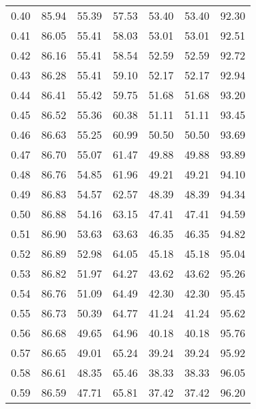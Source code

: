 \begin{tabular}{|c|c|c|c|c|c|c|}
      0.40 &     85.94 &     55.39 &      57.53 &   53.40 &      53.40 &         92.30 \\
      0.41 &     86.05 &     55.41 &      58.03 &   53.01 &      53.01 &         92.51 \\
      0.42 &     86.16 &     55.41 &      58.54 &   52.59 &      52.59 &         92.72 \\
      0.43 &     86.28 &     55.41 &      59.10 &   52.17 &      52.17 &         92.94 \\
      0.44 &     86.41 &     55.42 &      59.75 &   51.68 &      51.68 &         93.20 \\
      0.45 &     86.52 &     55.36 &      60.38 &   51.11 &      51.11 &         93.45 \\
      0.46 &     86.63 &     55.25 &      60.99 &   50.50 &      50.50 &         93.69 \\
      0.47 &     86.70 &     55.07 &      61.47 &   49.88 &      49.88 &         93.89 \\
      0.48 &     86.76 &     54.85 &      61.96 &   49.21 &      49.21 &         94.10 \\
      0.49 &     86.83 &     54.57 &      62.57 &   48.39 &      48.39 &         94.34 \\
      0.50 &     86.88 &     54.16 &      63.15 &   47.41 &      47.41 &         94.59 \\
      0.51 &     86.90 &     53.63 &      63.63 &   46.35 &      46.35 &         94.82 \\
      0.52 &     86.89 &     52.98 &      64.05 &   45.18 &      45.18 &         95.04 \\
      0.53 &     86.82 &     51.97 &      64.27 &   43.62 &      43.62 &         95.26 \\
      0.54 &     86.76 &     51.09 &      64.49 &   42.30 &      42.30 &         95.45 \\
      0.55 &     86.73 &     50.39 &      64.77 &   41.24 &      41.24 &         95.62 \\
      0.56 &     86.68 &     49.65 &      64.96 &   40.18 &      40.18 &         95.76 \\
      0.57 &     86.65 &     49.01 &      65.24 &   39.24 &      39.24 &         95.92 \\
      0.58 &     86.61 &     48.35 &      65.46 &   38.33 &      38.33 &         96.05 \\
      0.59 &     86.59 &     47.71 &      65.81 &   37.42 &      37.42 &         96.20 \\

\end{tabular}
